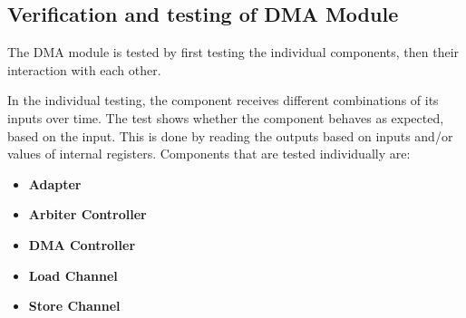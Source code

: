 \begin{appendix}
\section{Verification and testing of DMA Module}

The DMA module is tested by first testing the individual components, then their interaction with each other.

In the individual testing, the component receives different combinations of its inputs over time.
The test shows whether the component behaves as expected, based on the input.
This is done by reading the outputs based on inputs and/or values of internal registers.
Components that are tested individually are:
\begin{itemize}
    \item \textbf{Adapter} 
    \item \textbf{Arbiter Controller}
    \item \textbf{DMA Controller}
    \item \textbf{Load Channel}
    \item \textbf{Store Channel}
\end{itemize}


\end{appendix}
